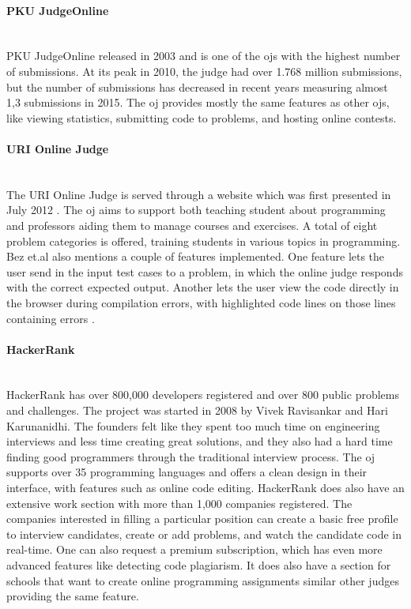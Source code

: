 \paragraph*{PKU JudgeOnline} \hfill \\
PKU JudgeOnline \cite{PKU} released in 2003 and is one of the \glspl{oj} with the highest number of submissions. At its peak in 2010, the judge had over 1.768 million submissions, but the number of submissions has decreased in recent years measuring almost 1,3 submissions in 2015. The \gls{oj} provides mostly the same features as other \glspl{oj}, like viewing statistics, submitting code to problems, and hosting online contests.
\clearpage
\paragraph*{URI Online Judge} \hfill \\
The URI Online Judge is served through a website which was first presented in July 2012 \cite{a:Bez2013}. The \gls{oj} aims to support both teaching student about programming and professors aiding them to manage courses and exercises. A total of eight problem categories is offered, training students in various topics in programming. Bez et.al also mentions a couple of features implemented. One feature lets the user send in the input test cases to a problem, in which the online judge responds with the correct expected output. Another lets the user view the code directly in the browser during compilation errors, with highlighted code lines on those lines containing errors \cite{a:Bez2013}.

\paragraph*{HackerRank} \hfill \\
HackerRank \cite{HACKERRANK} has over 800,000 developers registered and over 800 public problems and challenges. The project was started in 2008 by Vivek Ravisankar and Hari Karunanidhi. The founders felt like they spent too much time on engineering interviews and less time creating great solutions, and they also had a hard time finding good programmers through the traditional interview process. The \gls{oj} supports over 35 programming languages and offers a clean design in their interface, with features such as online code editing. HackerRank does also have an extensive work section with more than 1,000 companies registered. The companies interested in filling a particular position can create a basic free profile to interview candidates, create or add problems, and watch the candidate code in real-time. One can also request a premium subscription, which has even more advanced features like detecting code plagiarism. It does also have a section for schools that want to create online programming assignments similar other judges providing the same feature.

